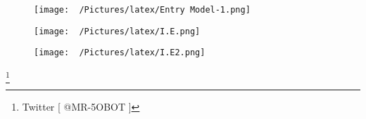 \documentclass{article}
\begin{document}
\begin{figure}[h!]
\begin{adjustbox}{width=1.15\textwidth,center}
  \texttt{[image: ~/Pictures/latex/Entry Model-1.png]}
\end{adjustbox}
  \label{fig:image}
\end{figure}

\begin{figure}[h!]
\begin{adjustbox}{width=1.15\textwidth,center}
  \texttt{[image: ~/Pictures/latex/I.E.png]}
\end{adjustbox}
  \label{fig:image}
\end{figure}

\begin{figure}[h!]
\begin{adjustbox}{width=1.15\textwidth,center}
  \texttt{[image: ~/Pictures/latex/I.E2.png]}
\end{adjustbox}
  \label{fig:image}
\end{figure}


\footnote{Twitter [ @MR-5OBOT ]}
\end{document}

